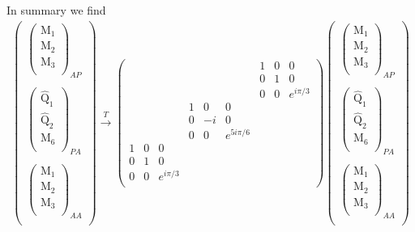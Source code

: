 \documentclass[12pt,a4paper]{article}
\newcounter{arrow}
\begin{document}
In summary we find
\begin{align}
\left(\begin{matrix}
\left( \begin{matrix}
\text{M}_1\\
\text{M}_2\\
\text{M}_3\\
\end{matrix} \right)_{AP} \\
\\
\left( \begin{matrix}
\widehat{\text{Q}}_1\\
\widehat{\text{Q}}_2\\
\text{M}_6\\
\end{matrix} \right)_{PA}\\
\\
\left( \begin{matrix}
\text{M}_1\\
\text{M}_2\\
\text{M}_3\\
\end{matrix} \right)_{AA} \\
\end{matrix} \right)
\xrightarrow{T} \left( \begin{matrix}
&&&			&&&			1&0&0	\\
&&&			&&&			0&1&0	\\
&&&			&&&			0&0&e^{i \pi/3}	\\
&&&			1&0&0&			&&	\\
&&&			0&-i&0&			&&	\\
&&&			0&0&e^{5 i \pi /6}&			&&	\\
1&0&0&			&&&			&&	\\
0&1&0&			&&&			&&	\\
0&0&e^{i \pi /3}&			&&&			&&	\\		
\end{matrix} \right)
\left(\begin{matrix}
\left( \begin{matrix}
\text{M}_1\\
\text{M}_2\\
\text{M}_3\\
\end{matrix} \right)_{AP} \\
\\
\left( \begin{matrix}
\widehat{\text{Q}}_1\\
\widehat{\text{Q}}_2\\
\text{M}_6\\
\end{matrix} \right)_{PA}\\
\\
\left( \begin{matrix}
\text{M}_1\\
\text{M}_2\\
\text{M}_3\\
\end{matrix} \right)_{AA} \\
\end{matrix} \right)
\end{align}
\end{document}
